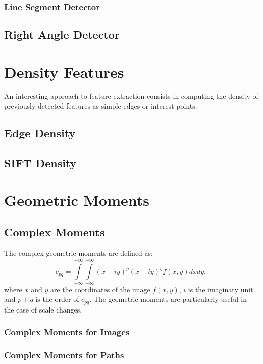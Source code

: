 \subsubsection{Line Segment Detector}
\label{sec:LSD}

\subsection{Right Angle Detector}
\label{sec:RightAngleDetector}



\section{Density Features}
An interesting approach to feature extraction consists in computing
the density of previously detected features as simple edges or
interest points.
\subsection{Edge Density}

\subsection{SIFT Density}


\section{Geometric Moments}

\subsection{Complex Moments}
\label{sec:ComplexMoments}
The complex geometric moments are defined as:
\begin {equation}
c_{pq} = \int\limits_{-\infty}^{+\infty}\int\limits_{-\infty}^{+\infty}(x + iy)^p(x- iy)^qf(x,y)dxdy,
\label{2.2}
\end{equation}
where $x$ and $y$ are the coordinates of the image $f(x,y)$, $i$ is the
imaginary unit and
$p+q$ is the order of $c_{pq}$. The geometric moments are
particularly useful in the case of scale changes.

\subsubsection{Complex Moments for Images}

\subsubsection{Complex Moments for Paths}



